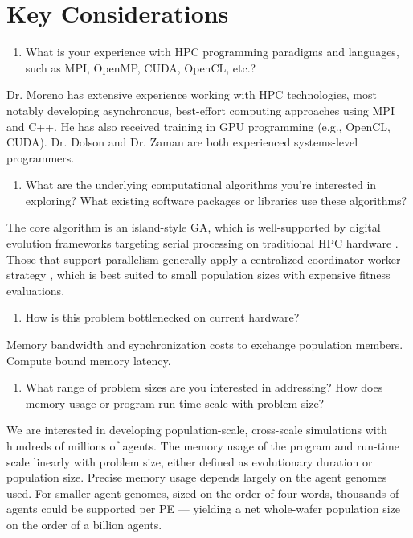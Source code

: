 \section{Key Considerations} \label{sec:key-considerations}

\begin{enumerate} \itshape \bfseries
\item %
What is your experience with HPC programming paradigms and languages, such as MPI, OpenMP, CUDA, OpenCL, etc.?
\end{enumerate}
\noindent
Dr. Moreno has extensive experience working with HPC technologies, most notably developing asynchronous, best-effort computing approaches using MPI and C++.
He has also received training in GPU programming (e.g., OpenCL, CUDA).
Dr. Dolson and Dr. Zaman are both experienced systems-level programmers.

\begin{enumerate}[resume] \itshape \bfseries
\item What are the underlying computational algorithms you're interested in exploring?
What existing software packages or libraries use these algorithms?
\end{enumerate}
\noindent
The core algorithm is an island-style GA, which is well-supported by digital evolution frameworks targeting serial processing on traditional HPC hardware \citep{bohm2017mabe}.
Those that support parallelism generally apply a centralized coordinator-worker strategy \citep{fortin2012deap}, which is best suited to small population sizes with expensive fitness evaluations.

\begin{enumerate}[resume] \itshape \bfseries
\item How is this problem bottlenecked on current hardware?
\end{enumerate}
\noindent
Memory bandwidth and synchronization costs to exchange population members.
Compute bound memory latency.

\begin{enumerate}[resume] \itshape \bfseries
\item What range of problem sizes are you interested in addressing?
How does memory usage or program run-time scale with problem size?
\end{enumerate}
\noindent
We are interested in developing population-scale, cross-scale simulations with hundreds of millions of agents.
The memory usage of the program and run-time scale linearly with problem size, either defined as evolutionary duration or population size.
Precise memory usage depends largely on the agent genomes used.
For smaller agent genomes, sized on the order of four words, thousands of agents could be supported per PE --- yielding a net whole-wafer population size on the order of a billion agents.

